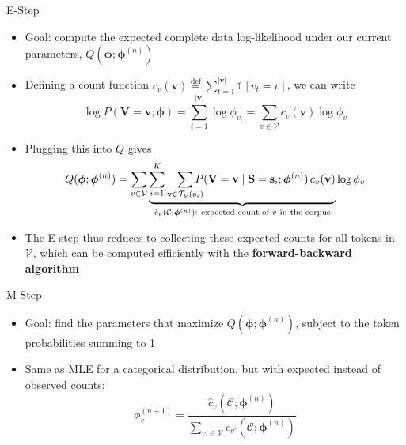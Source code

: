 \documentclass[11pt,compress,t,notes=noshow, xcolor=table]{beamer}
\newcommand{\vocab}{\mathcal{V}}
\newcommand{\probs}{\boldsymbol{\phi}}
\begin{document}
\begin{frame}{E-Step}
 
\vfill
 
\begin{itemize}
\item Goal: compute the expected complete data log-likelihood under our current parameters, $Q(\probs; \probs^{(n)}) $
\item Defining a count function $c_v(\mathbf{v}) \overset{\text{def}}{=} \sum_{t=1}^{|\mathbf{v}|} \mathds{1}[v_t = v]$, we can write
\begin{equation*}
\log P(\mathbf{V} = \mathbf{v}; \probs)= \sum_{t=1}^{|\mathbf{v}|} \log \phi_{v_t} = \sum_{v \in \vocab} c_v(\mathbf{v}) \log \phi_v
\end{equation*}
\item Plugging this into $Q$ gives
\begin{equation*}
Q(\probs; \probs^{(n)}) = \sum_{v \in \vocab} \underbrace{\sum_{i=1}^{K} \smashoperator[r]{\sum_{\mathbf{v} \in \mathcal{T}_{\vocab}(\mathbf{s}_i)}} P(\mathbf{V} = \mathbf{v} \mid \mathbf{S} = \mathbf{s}_i; \probs^{(n)})\, c_v(\mathbf{v})}_{\hat{c}_v(\mathcal{C}; \probs^{(n)}):\ \text{expected count of } v \text{ in the corpus}} \log \phi_v
\end{equation*}
\item The E-step thus reduces to collecting these expected counts for all tokens in $\vocab$, which can be computed efficiently with the \textbf{forward-backward algorithm}
\end{itemize}
 
\vfill
 
\end{frame}
 
 
\begin{frame}{M-Step}
 
\vfill
 
\begin{itemize}
\item Goal: find the parameters that maximize $Q(\probs; \probs^{(n)})$, subject to the token probabilities summing to 1
\item Same as MLE for a categorical distribution, but with expected instead of observed counts:
\begin{equation*}
\phi^{(n+1)}_v = \frac{\hat{c}_v(\mathcal{C}; \probs^{(n)})}{\sum_{v' \in \vocab} \hat{c}_{v'}(\mathcal{C}; \probs^{(n)})}
\end{equation*}
\end{itemize}
 
\vfill
 
\end{frame}
\end{document}
